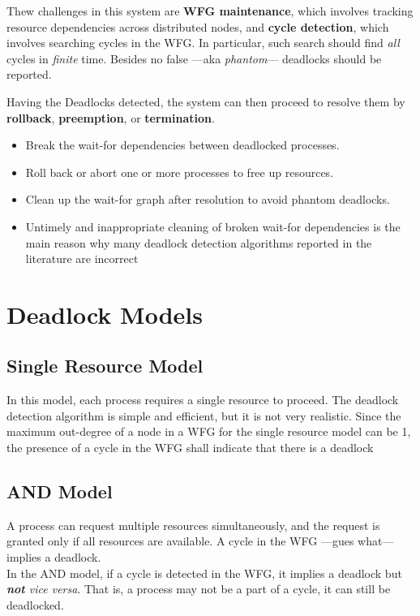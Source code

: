 Thew challenges in this system are \textbf{WFG maintenance}, which involves tracking resource dependencies across distributed nodes, and \textbf{cycle detection}, which involves searching cycles in the WFG. 
In particular, such search should find \textit{all} cycles in \textit{finite} time. Besides no false ---aka \textit{phantom}--- deadlocks should be reported.

{Having the Deadlocks detected, the system can then proceed to resolve them by \textbf{rollback}, \textbf{preemption}, or \textbf{termination}.\ns
\begin{itemize}
	\item Break the wait-for dependencies between deadlocked processes.
	\item Roll back or abort one or more processes to free up resources.
	\item Clean up the wait-for graph after resolution to avoid phantom deadlocks.
	\item Untimely and inappropriate cleaning of broken wait-for dependencies is the main reason why many deadlock detection algorithms reported in the literature are incorrect
\end{itemize}}

\section{Deadlock Models}
\subsection{Single Resource Model}
In this model, each process requires a single resource to proceed. The deadlock detection algorithm is simple and efficient, but it is not very realistic.
Since the maximum out-degree of a node in a WFG for the single resource model can be 1, the presence of a cycle in the WFG shall indicate that there is a deadlock

\subsection{AND Model}
A process can request multiple resources simultaneously, and the request is granted only if all resources are available.
A cycle in the WFG ---gues what--- implies a deadlock.\\
In the AND model, if a cycle is detected in the WFG, it implies a deadlock but \textit{\textbf{not} vice versa}. That is, a process may not be a part of a cycle, it can still be deadlocked.

